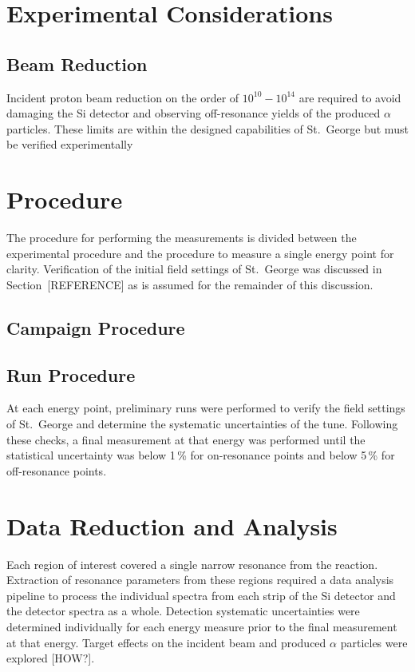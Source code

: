 \section{Experimental Considerations}

\subsection{Beam Reduction}
Incident proton beam reduction on the order of $10^{10} - 10^{14}$ are
required to avoid damaging the Si detector and observing off-resonance
yields of the produced $\alpha$ particles. These limits are within the
designed capabilities of St.\ George but must be verified experimentally




\section{Procedure}

The procedure for performing the \alpa{} measurements is divided between
the experimental procedure and the procedure to measure a single energy
point for clarity. Verification of the initial field settings of St.\
George was discussed in Section~[REFERENCE] as is assumed for the
remainder of this discussion.

\subsection{Campaign Procedure}



\subsection{Run Procedure}

At each energy point, preliminary runs were performed to verify the
field settings of St.\ George and determine the systematic uncertainties
of the tune. Following these checks, a final measurement at that energy
was performed until the statistical uncertainty was below 1\,\% for
on-resonance points and below 5\,\% for off-resonance points.




\section{Data Reduction and Analysis}

Each region of interest covered a single narrow resonance from the
\alpa{} reaction. Extraction of resonance parameters from these regions
required a data analysis pipeline to process the individual spectra from
each strip of the Si detector and the detector spectra as a whole.
Detection systematic uncertainties were determined individually for each
energy measure prior to the final measurement at that energy. Target
effects on the incident beam and produced $\alpha$ particles were
explored [HOW?].

